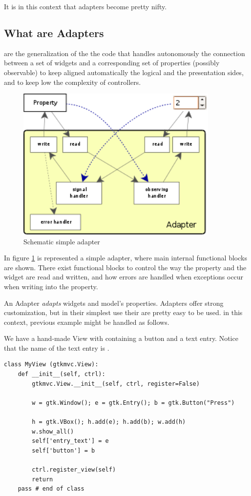 \smallskip
It is in this context that adapters become pretty nifty. 

\subsection{What are Adapters}

 are the generalization of the the code that handles
autonomously the connection between a set of widgets and a
corresponding set of properties (possibly observable) to keep
aligned automatically the logical and the presentation sides, and to
keep low the complexity of controllers.

\begin{figure}[htbp]
\begin{center}
\includegraphics[width=10cm]{figs/png/adap}
\caption{\label{ADAP_f} Schematic simple adapter}
\end{center}
\end{figure}

In figure \ref{ADAP_f} is represented a simple adapter, where main
internal functional blocks are shown. There exist functional blocks
to control the way the property and the widget are read and written,
and how errors are handled when exceptions occur when writing into
the property.

An Adapter \emph{adapts} widgets and model's properties. Adapters
offer strong customization, but in their simplest use their are
pretty easy to be used. in this context, previous example might be
handled as follows.

We have a hand-made View with containing a button and a text
entry. Notice that the name of the text entry is
.

{ \codesize
\begin{verbatim}
class MyView (gtkmvc.View):
    def __init__(self, ctrl):
        gtkmvc.View.__init__(self, ctrl, register=False)

        w = gtk.Window(); e = gtk.Entry(); b = gtk.Button("Press")

        h = gtk.VBox(); h.add(e); h.add(b); w.add(h)
        w.show_all()
        self['entry_text'] = e
        self['button'] = b
        
        ctrl.register_view(self)
        return
    pass # end of class
\end{verbatim}
}


